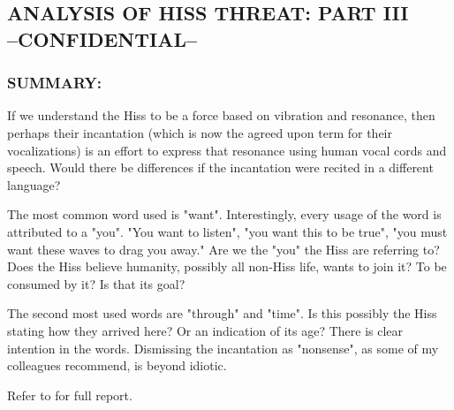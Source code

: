 \subsection*{ANALYSIS OF HISS THREAT: PART III\\
	--CONFIDENTIAL--}
\subsubsection*{SUMMARY:}
\par If we understand the Hiss to be a force based on vibration and
resonance, then perhaps their incantation (which is now the
agreed upon term for their vocalizations) is an effort to express
that resonance using human vocal cords and speech. Would
there be differences if the incantation were recited in a different
language?
\par The most common word used is "want". Interestingly, every usage
of the word is attributed to a "you". "You want to listen", "you want
this to be true", "you must want these waves to drag you away."
Are we the "you" the Hiss are referring to? Does the Hiss believe
humanity, possibly all non-Hiss life, wants to join it? To be
consumed by it? Is that its goal?
\par The second most used words are "through" and "time". Is this
possibly the Hiss stating how they arrived here? Or an indication
of its age?
There is clear intention in the words. Dismissing the incantation
as "nonsense", as some of my colleagues recommend, is beyond
idiotic.
\par Refer to  for full report.